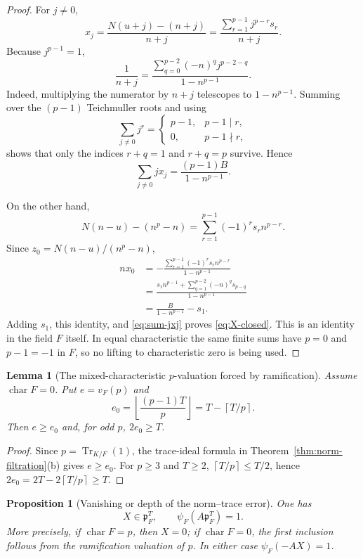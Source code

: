 \documentclass[11pt]{amsart}
\newtheorem{proposition}[theorem]{Proposition}
\newtheorem{lemma}[theorem]{Lemma}
\theoremstyle{definition}
\theoremstyle{remark}
\newcommand{\p}{\mathfrak p}
\newcommand{\Tr}{\operatorname{Tr}}
\newcommand{\ceil}[1]{\left\lceil #1\right\rceil}
\newcommand{\floor}[1]{\left\lfloor #1\right\rfloor}
\begin{document}
\begin{proof}
For $j\ne0$,
\[
 x_j=\frac{N(u+j)-(n+j)}{n+j}
 =\frac{\sum_{r=1}^{p-1}j^{p-r}s_r}{n+j}.
\]
Because $j^{p-1}=1$,
\begin{equation}\label{eq:inverse-nj}
 \frac1{n+j}=
 \frac{\sum_{q=0}^{p-2}(-n)^qj^{p-2-q}}
      {1-n^{p-1}}.
\end{equation}
Indeed, multiplying the numerator by $n+j$ telescopes to
$1-n^{p-1}$.  Summing over the $(p-1)$ Teichmuller roots and using
\[
 \sum_{j\ne0}j^r=
 \begin{cases}p-1,&p-1\mid r,\\0,&p-1\nmid r,
 \end{cases}
\]
shows that only the indices $r+q=1$ and $r+q=p$ survive.  Hence
\begin{equation}\label{eq:sum-jxj}
 \sum_{j\ne0}jx_j=\frac{(p-1)B}{1-n^{p-1}}.
\end{equation}

On the other hand,
\[
 N(n-u)-(n^p-n)=\sum_{r=1}^{p-1}(-1)^rs_rn^{p-r}.
\]
Since $z_0=N(n-u)/(n^p-n)$,
\begin{align*}
 nx_0
 &=-\frac{\sum_{r=1}^{p-1}(-1)^rs_rn^{p-r}}
          {1-n^{p-1}}\\
 &=\frac{s_1n^{p-1}+\sum_{q=1}^{p-2}(-n)^qs_{p-q}}
          {1-n^{p-1}}\\
 &=\frac{B}{1-n^{p-1}}-s_1.
\end{align*}
Adding $s_1$, this identity, and \eqref{eq:sum-jxj} proves
\eqref{eq:X-closed}.  This is an identity in the field $F$ itself.  In
equal characteristic the same finite sums have $p=0$ and $p-1=-1$ in
$F$, so no lifting to characteristic zero is being used.
\end{proof}

\begin{lemma}[The mixed-characteristic $p$-valuation forced by ramification]
\label{lem:p-valuation}
Assume $\operatorname{char}F=0$.  Put $e=v_F(p)$ and
\[
 e_0=\floor{\frac{(p-1)T}{p}}=T-\ceil{T/p}.
\]
Then $e\ge e_0$ and, for odd $p$, $2e_0\ge T$.
\end{lemma}

\begin{proof}
Since $p=\Tr_{K/F}(1)$, the trace-ideal formula in
Theorem~\ref{thm:norm-filtration}(b) gives $e\ge e_0$.
For $p\ge3$ and $T\ge2$, $\ceil{T/p}\le T/2$, hence
$2e_0=2T-2\ceil{T/p}\ge T$.
\end{proof}

\begin{proposition}[Vanishing or depth of the norm--trace error]
\label{prop:X-depth}
One has
\begin{equation}\label{eq:X-depth-final}
 X\in\p_F^T,
 \qquad \psi_F(A\p_F^T)=1.
\end{equation}
More precisely, if $\operatorname{char}F=p$, then $X=0$; if
$\operatorname{char}F=0$, the first inclusion follows from the
ramification valuation of $p$.  In either case
$\psi_F(-AX)=1$.
\end{proposition}
\end{document}
